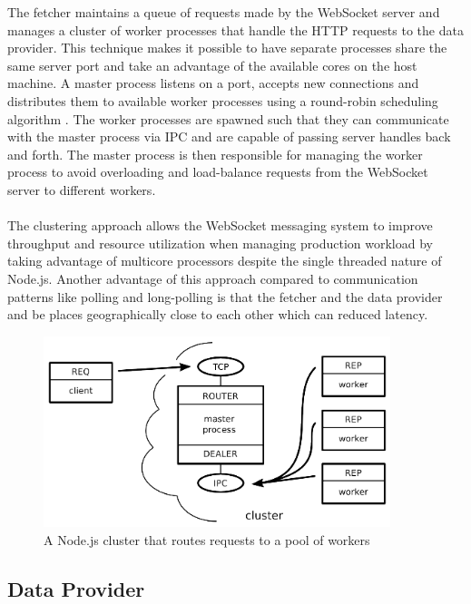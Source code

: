 The fetcher maintains a queue of requests made by the WebSocket server and manages a cluster of worker processes that handle the HTTP requests to the data provider. This technique makes it possible to have separate processes share the same server port and take an advantage of the available cores on the host machine. A master process listens on a port, accepts new connections and distributes them to available worker processes using a round-robin scheduling algorithm \cite{nodeCluster}. The worker processes are spawned such that they can communicate with the master process via IPC and are capable of passing server handles back and forth. The master process is then responsible for managing the worker process to avoid overloading and load-balance requests from the WebSocket server to different workers.
\\ \\
The clustering approach allows the WebSocket messaging system to improve throughput and resource utilization when managing production workload by taking advantage of multicore processors despite the single threaded nature of Node.js. Another advantage of this approach compared to communication patterns like polling and long-polling is that the fetcher and the data provider and be places geographically close to each other which can reduced latency.
\\
\begin{figure}[h!]
	\centering
	\label{fig:webSocketMessagingSystem}\includegraphics[width=0.9\textwidth]{images/poolOfWorkers}
	\caption{A Node.js cluster that routes requests to a pool of workers \cite{judd2008node}}
\end{figure}

\subsection{Data Provider}

